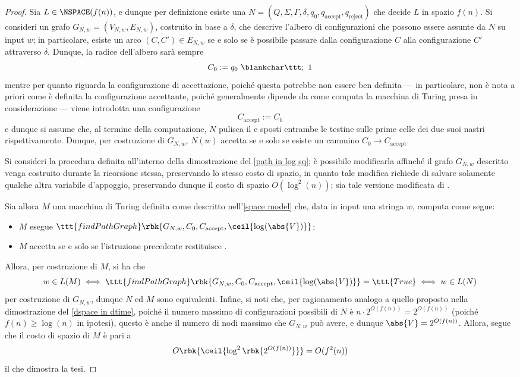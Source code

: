\documentclass[a4paper, 12pt]{report}
\begin{document}
    \begin{proof}
        Sia $L \in \NSPACE(f(n))$, e dunque per definizione esiste una \NTM $N = (Q, \Sigma, \Gamma, \delta, q_0, q_\mathrm{accept}, q_\mathrm{reject})$ che decide $L$ in spazio $f(n)$. Si consideri un grafo $G_{N,w} = (V_{N, w}, E_{N, w})$, costruito in base a $\delta$, che descrive l'albero di configurazioni che possono essere assunte da $N$ su input $w$; in particolare, esiste un arco $(C, C') \in E_{N, w}$ se e solo se è possibile passare dalla configurazione $C$ alla configurazione $C'$ attraverso $\delta$. Dunque, la radice dell'albero sarà sempre $$C_0 := q_0 \ \blankchar \ttt; \ 1$$ mentre per quanto riguarda la configurazione di accettazione, poiché questa potrebbe non essere ben definita --- in particolare, non è nota a priori come è definita la configurazione accettante, poiché generalmente dipende da come computa la macchina di Turing presa in considerazione --- viene introdotta una configurazione $$C_\mathrm{accept} := C_0$$ e dunque si assume che, al termine della computazione, $N$ pulisca il  e sposti entrambe le testine sulle prime celle dei due suoi nastri rispettivamente. Dunque, per costruzione di $G_{N,w}$, $N(w)$ accetta se e solo se esiste un cammino $C_0 \to C_\mathrm{accept}$.

        Si consideri la procedura  definita all'interno della dimostrazione del \cref{path in log sq}; è possibile modificarla affinché il grafo $G_{N, w}$ descritto venga costruito durante la ricorsione stessa, preservando lo stesso costo di spazio, in quanto tale modifica richiede di salvare solamente qualche altra variabile d'appoggio, preservando dunque il costo di spazio $O(\log^2(n))$; sia  tale versione modificata di .

        Sia allora $M$ una macchina di Turing definita come descritto nell'\cref{space model} che, data in input una stringa $w$, computa come segue:

        \begin{itemize}
            \item $M$ esegue $\ttt{findPathGraph} \rbk{G_{N, w}, C_0, C_\mathrm{accept}, \ceil{\log(\abs{V})}}$;
            \item $M$ accetta se e solo se l'istruzione precedente restituisce .
        \end{itemize}

        Allora, per costruzione di $M$, si ha che $$w \in L(M) \iff \ttt{findPathGraph} \rbk{G_{N, w}, C_0, C_\mathrm{accept}, \ceil{\log(\abs{V})}} = \ttt{True} \iff w \in L(N)$$ per costruzione di $G_{N, w}$, dunque $N$ ed $M$ sono equivalenti. Infine, si noti che, per ragionamento analogo a quello proposto nella dimostrazione del \cref{dspace in dtime}, poiché il numero massimo di configurazioni possibili di $N$ è $n \cdot 2^{O(f(n))} = 2^{O(f(n))}$ (poiché $f(n) \geq \log(n)$ in ipotesi), questo è anche il numero di nodi massimo che $G_{N, w}$ può avere, e dunque $\abs{V} = 2^{O(f(n))}$. Allora, segue che il costo di spazio di $M$ è pari a $$O \rbk{\ceil {\log^2 \rbk{2^{O(f(n))}}}} = O(f^2(n))$$ il che dimostra la tesi.
    \end{proof}
\end{document}
